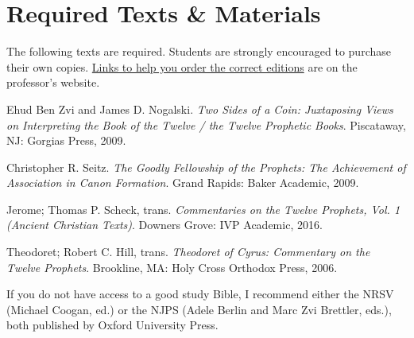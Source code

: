 \documentclass[titlepage]{article}
\newcommand\incl{../includes}
\begin{document}


%

\section{Required Texts \& Materials}
\label{texts}

The following texts are required. Students are strongly encouraged to
purchase their own copies. \href{http://danieldriver.com/courses/hb-3114/#required-texts-winter-2018}{Links to help you order the correct editions} are on the professor's website.

\begingroup
\renewcommand{\section}[2]{}%
\begin{thebibliography}{Theodoret}%

	 Ehud Ben Zvi and James D. Nogalski.
	\emph{Two Sides of a Coin: Juxtaposing Views on Interpreting the Book of the Twelve / the Twelve Prophetic Books}.
	Piscataway, NJ: Gorgias Press, 2009.

	 Christopher R. Seitz.
	\emph{The Goodly Fellowship of the Prophets: The Achievement of Association in Canon Formation}.
	Grand Rapids: Baker Academic, 2009.

	 Jerome; Thomas P. Scheck, trans.
	\emph{Commentaries on the Twelve Prophets, Vol. 1 (Ancient Christian Texts)}.
	Downers Grove: IVP Academic, 2016.

	 Theodoret; Robert C. Hill, trans.
	\emph{Theodoret of Cyrus: Commentary on the Twelve Prophets}.
	Brookline, MA: Holy Cross Orthodox Press, 2006.

\end{thebibliography}
\endgroup

If you do not have access to a good study Bible, I recommend either the
NRSV (Michael Coogan, ed.) or the NJPS (Adele Berlin and Marc Zvi
Brettler, eds.), both published by Oxford University Press.
\end{document}
